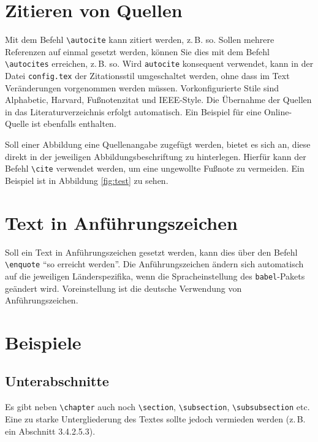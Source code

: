 \section{Zitieren von Quellen}
Mit dem Befehl \texttt{\textbackslash autocite} kann zitiert werden, z.\,B. so. \autocite[Vgl.][S. 18ff.]{ME12} Sollen mehrere Referenzen auf einmal gesetzt werden, können Sie dies mit dem Befehl \texttt{\textbackslash autocites} erreichen, z.\,B. so\autocites[Vgl.][S. 10]{ME12}[][S. 100]{TD15}. Wird \texttt{autocite} konsequent 
verwendet, kann in der Datei \texttt{config.tex} der Zitationsstil umgeschaltet werden, ohne dass im Text Veränderungen vorgenommen werden müssen. Vorkonfigurierte Stile sind Alphabetic, Harvard, Fußnotenzitat und IEEE-Style. Die Übernahme der Quellen in das Literaturverzeichnis erfolgt automatisch. Ein Beispiel für eine Online-Quelle ist ebenfalls enthalten.




Soll einer Abbildung eine Quellenangabe zugefügt werden, bietet es sich an, diese direkt in der jeweiligen Abbildungsbeschriftung zu hinterlegen. Hierfür kann der Befehl \texttt{\textbackslash cite} verwendet werden, um eine ungewollte Fußnote zu vermeiden. Ein Beispiel ist in Abbildung 
\vref{fig:test} zu sehen. 


\section{Text in Anführungszeichen}
Soll ein Text in Anführungszeichen gesetzt werden, kann dies über den Befehl \texttt{\textbackslash enquote} \enquote{so erreicht werden}. Die Anführungszeichen ändern sich automatisch auf die 
jeweiligen Länderspezifika, wenn die Spracheinstellung des \texttt{babel}-Pakets geändert wird. Voreinstellung ist die deutsche Verwendung von 
Anführungszeichen.




\section{Beispiele}

\subsection{Unterabschnitte}
Es gibt neben \texttt{\textbackslash chapter} auch noch  \texttt{\textbackslash section}, \texttt{\textbackslash subsection}, \texttt{\textbackslash subsubsection} etc. Eine zu starke Untergliederung des Textes sollte jedoch vermieden werden (z.\,B. ein Abschnitt 3.4.2.5.3). 

